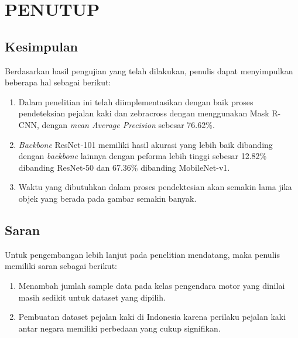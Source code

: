 \chapter{PENUTUP}
\label{chap:penutup}


\section{Kesimpulan}
\label{sec:kesimpulan}

Berdasarkan hasil pengujian yang telah dilakukan, penulis dapat menyimpulkan beberapa hal sebagai berikut:

\begin{enumerate}[nolistsep]

  \item Dalam penelitian ini telah diimplementasikan dengan baik proses pendeteksian pejalan kaki dan zebracross dengan menggunakan Mask R-CNN, dengan \textit{mean Average Precision} sebesar 76.62\%.
  \item \textit{Backbone} ResNet-101 memiliki hasil akurasi yang lebih baik dibanding dengan \textit{backbone} lainnya dengan peforma lebih tinggi sebesar 12.82\% dibanding ResNet-50 dan 67.36\% dibanding MobileNet-v1. 
  \item Waktu yang dibutuhkan dalam proses pendektesian akan semakin lama jika objek yang berada pada gambar semakin banyak.
  
\end{enumerate}

\section{Saran}
\label{sec:saran}

Untuk pengembangan lebih lanjut pada penelitian mendatang, maka penulis memiliki saran sebagai berikut:

\begin{enumerate}[nolistsep]

  \item Menambah jumlah sample data pada kelas pengendara motor yang dinilai masih sedikit untuk dataset yang dipilih.

  \item Pembuatan dataset pejalan kaki di Indonesia karena perilaku pejalan kaki antar negara memiliki perbedaan yang cukup signifikan.

\end{enumerate}
